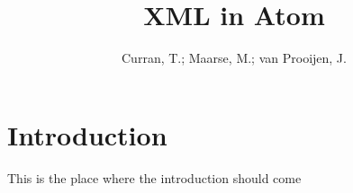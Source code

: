 \documentclass{report}
\title{XML in Atom}
\author{Curran, T.; Maarse, M.; van Prooijen, J.}
\begin{document}
	\maketitle{}
	\tableofcontents
	\section{Introduction}
	This is the place where the introduction should come 
	
		
	
	
	
\end{document}
